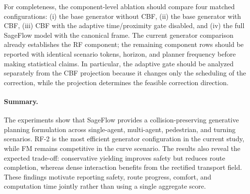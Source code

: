 For completeness, the component-level ablation should compare four
matched configurations: (i) the base generator without CBF,
(ii) the base generator with CBF, (iii) CBF with the adaptive
time/proximity gate disabled, and (iv) the full SageFlow model with the
canonical frame.  The current generator comparison already establishes
the RF component; the remaining component rows should be reported with
identical scenario tokens, horizon, and planner frequency before making
statistical claims.  In particular, the adaptive gate should be
analyzed separately from the CBF projection because it changes only the
scheduling of the correction, while the projection determines the
feasible correction direction.

\paragraph{Summary.}
The experiments show that SageFlow provides a collision-preserving
generative planning formulation across single-agent, multi-agent,
pedestrian, and turning scenarios.  RF-2 is the most efficient
generator configuration in the current study, while FM remains
competitive in the curve scenario.  The results also reveal the
expected trade-off: conservative yielding improves safety but reduces
route completion, whereas dense interaction benefits from the
rectified transport field.  These findings motivate reporting safety,
route progress, comfort, and computation time jointly rather than
using a single aggregate score.
